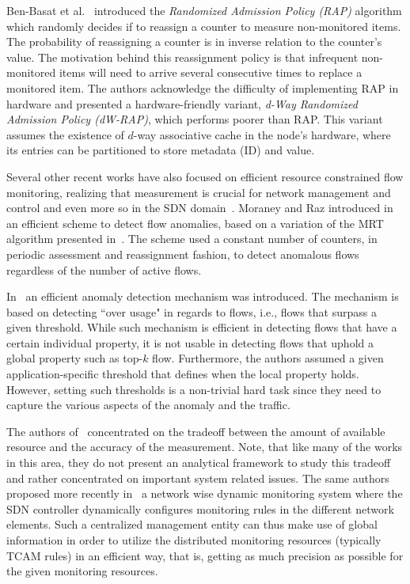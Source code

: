 Ben-Basat et al.~\cite{Ben-Basat2017} introduced the \textit{Randomized Admission Policy (RAP)} algorithm which randomly decides if to reassign a counter to measure non-monitored items. The probability of reassigning a counter is in inverse relation to the counter's value. The motivation behind this reassignment policy is that infrequent non-monitored items will need to arrive several consecutive times to replace a monitored item. The authors acknowledge the difficulty of implementing RAP in hardware and presented a hardware-friendly variant, \textit{d-Way Randomized Admission Policy (dW-RAP)}, which performs poorer than RAP. This variant assumes the existence of $d$-way associative cache in the node's hardware, where its entries can be partitioned to store metadata (ID) and value.

Several other recent works have also focused on efficient resource constrained flow monitoring, realizing that measurement is crucial for network management and control and even more so in the SDN domain~\cite{Moraney2016, Moshref2013, Moshref2014}. Moraney and Raz introduced in~\cite{Moraney2016} an efficient scheme to detect flow anomalies, based on a variation of the MRT algorithm presented in~\cite{Moshref2014}. The scheme used a constant number of counters, in periodic assessment and reassignment fashion, to detect anomalous flows regardless of the number of active flows.

In~\cite{Moraney2016} an efficient anomaly detection mechanism was introduced. The mechanism is based on detecting ``over usage" in regards to flows, i.e., flows that surpass a given threshold. While such mechanism is efficient in detecting flows that have a certain individual property, it is not usable in detecting flows that uphold a global property such as top-$k$ flow. Furthermore, the authors assumed a given application-specific threshold that defines when the local property holds. However, setting such thresholds is a non-trivial hard task since they need to capture the various aspects of the anomaly and the traffic.

The authors of~\cite{Moshref2013} concentrated on the tradeoff between the amount of available resource and the accuracy of the measurement. Note, that like many of the works in this area, they do not present an analytical framework to study this tradeoff and rather concentrated on important system related issues.
The same authors proposed more recently in~\cite{Moshref2014} a network wise dynamic monitoring system where the SDN controller dynamically configures monitoring rules in the different network elements. Such a centralized management entity can thus make use of global information in order to utilize the distributed monitoring resources (typically TCAM rules) in an efficient way, that is, getting as much precision as possible for the given monitoring resources.
